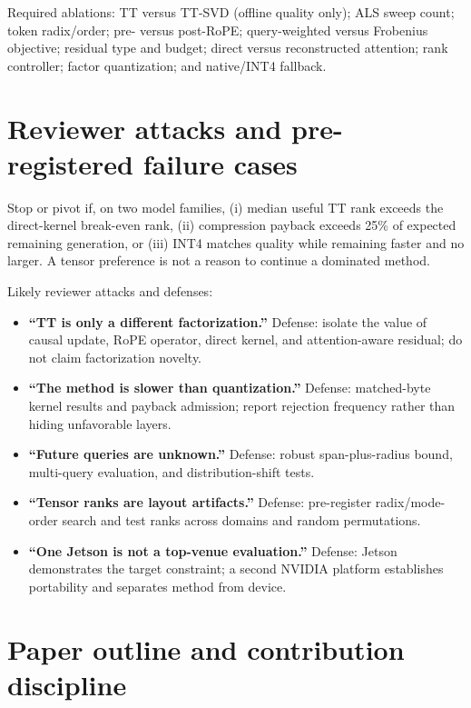 \documentclass[11pt]{article}
\begin{document}
Required ablations: TT versus TT-SVD (offline quality only); ALS sweep count; token radix/order;
pre- versus post-RoPE; query-weighted versus Frobenius objective; residual type and budget; direct
versus reconstructed attention; rank controller; factor quantization; and native/INT4 fallback.

\section{Reviewer attacks and pre-registered failure cases}

\begin{riskbox}
Stop or pivot if, on two model families, (i) median useful TT rank exceeds the direct-kernel
break-even rank, (ii) compression payback exceeds 25\% of expected remaining generation, or
(iii) INT4 matches quality while remaining faster and no larger. A tensor preference is not a
reason to continue a dominated method.
\end{riskbox}

Likely reviewer attacks and defenses:
\begin{itemize}[leftmargin=1.5em,itemsep=2pt]
\item \textbf{``TT is only a different factorization.''} Defense: isolate the value of causal update,
RoPE operator, direct kernel, and attention-aware residual; do not claim factorization novelty.
\item \textbf{``The method is slower than quantization.''} Defense: matched-byte kernel results and
payback admission; report rejection frequency rather than hiding unfavorable layers.
\item \textbf{``Future queries are unknown.''} Defense: robust span-plus-radius bound, multi-query
evaluation, and distribution-shift tests.
\item \textbf{``Tensor ranks are layout artifacts.''} Defense: pre-register radix/mode-order search
and test ranks across domains and random permutations.
\item \textbf{``One Jetson is not a top-venue evaluation.''} Defense: Jetson demonstrates the target
constraint; a second NVIDIA platform establishes portability and separates method from device.
\end{itemize}

\section{Paper outline and contribution discipline}
\end{document}

